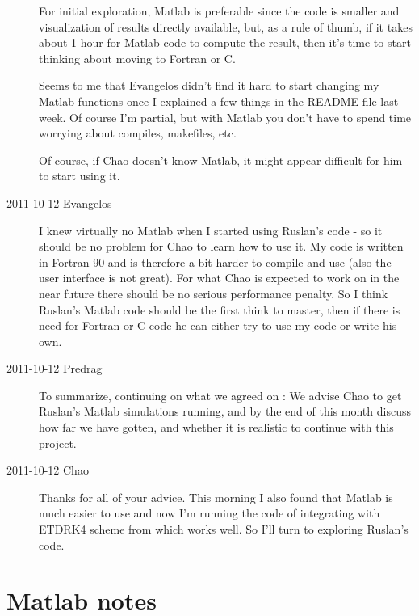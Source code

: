 \begin{description}
For initial exploration, Matlab is preferable since the code is smaller
and visualization of results directly available, but, as a rule of thumb,
if it takes about 1 hour for Matlab code to compute the result,
then it's time to start thinking about moving to Fortran or C.

Seems to me that Evangelos didn't find it hard to start changing my Matlab
functions once I explained a few things in the README file last week.
Of course I'm partial, but with Matlab you don't have to spend time worrying
about compiles, makefiles, etc.

Of course, if Chao doesn't know Matlab, it might appear difficult
for him to start using it.


\item[2011-10-12 Evangelos]
I knew virtually no Matlab when I started using Ruslan's code
- so it should be no problem for Chao to learn how to use it. My code
is written in Fortran 90 and is therefore a bit harder to compile and
use (also the user interface is not great). For what Chao is expected
to work on in the near future there should be no serious performance
penalty. So I think Ruslan's Matlab code should be the first think to
master, then if there is need for Fortran or C code he can either try
to use my code or write his own.

\item[2011-10-12 Predrag]
To summarize, continuing on what we agreed on :
We advise Chao to get Ruslan's Matlab simulations running, and by the
end of this month discuss how far we have gotten, and
whether it is realistic to continue with this project.

\item[2011-10-12 Chao]
Thanks for all of your advice. This morning I also found that Matlab is
much easier to use and now I'm running the code of integrating \KSe  with
ETDRK4 scheme from  which works well. So I'll turn to
exploring Ruslan's code.

\end{description}

\section{Matlab notes}
\label{s:matlab}

